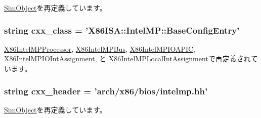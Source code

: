 \hyperlink{classm5_1_1SimObject_1_1SimObject_a17fa61ac3806b481cafee5593b55e5d0}{SimObject}を再定義しています。\hypertarget{classIntelMP_1_1X86IntelMPBaseConfigEntry_a58cd55cd4023648e138237cfc0822ae3}{
\subsubsection[{cxx\_\-class}]{\setlength{\rightskip}{0pt plus 5cm}string {\bf cxx\_\-class} = '{\bf X86ISA::IntelMP::BaseConfigEntry}'}}
\label{classIntelMP_1_1X86IntelMPBaseConfigEntry_a58cd55cd4023648e138237cfc0822ae3}


\hyperlink{classIntelMP_1_1X86IntelMPProcessor_a58cd55cd4023648e138237cfc0822ae3}{X86IntelMPProcessor}, \hyperlink{classIntelMP_1_1X86IntelMPBus_a58cd55cd4023648e138237cfc0822ae3}{X86IntelMPBus}, \hyperlink{classIntelMP_1_1X86IntelMPIOAPIC_a58cd55cd4023648e138237cfc0822ae3}{X86IntelMPIOAPIC}, \hyperlink{classIntelMP_1_1X86IntelMPIOIntAssignment_a58cd55cd4023648e138237cfc0822ae3}{X86IntelMPIOIntAssignment}, と \hyperlink{classIntelMP_1_1X86IntelMPLocalIntAssignment_a58cd55cd4023648e138237cfc0822ae3}{X86IntelMPLocalIntAssignment}で再定義されています。\hypertarget{classIntelMP_1_1X86IntelMPBaseConfigEntry_a17da7064bc5c518791f0c891eff05fda}{
\subsubsection[{cxx\_\-header}]{\setlength{\rightskip}{0pt plus 5cm}string {\bf cxx\_\-header} = 'arch/x86/bios/intelmp.hh'}}
\label{classIntelMP_1_1X86IntelMPBaseConfigEntry_a17da7064bc5c518791f0c891eff05fda}


\hyperlink{classm5_1_1SimObject_1_1SimObject_a17da7064bc5c518791f0c891eff05fda}{SimObject}を再定義しています。

